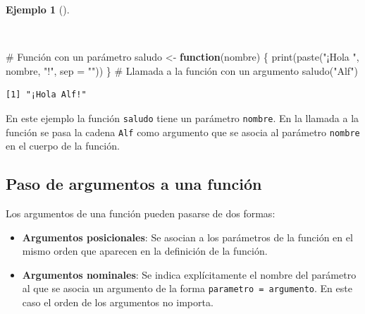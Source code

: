 \documentclass[
  spanish,
  a4paper,
]{scrreport}
\newenvironment{Shaded}{\begin{snugshade}}{\end{snugshade}}
\newcommand{\AttributeTok}[1]{\textcolor[rgb]{0.40,0.45,0.13}{#1}}
\newcommand{\CommentTok}[1]{\textcolor[rgb]{0.37,0.37,0.37}{#1}}
\newcommand{\ControlFlowTok}[1]{\textcolor[rgb]{0.00,0.23,0.31}{\textbf{#1}}}
\newcommand{\FunctionTok}[1]{\textcolor[rgb]{0.28,0.35,0.67}{#1}}
\newcommand{\NormalTok}[1]{\textcolor[rgb]{0.00,0.23,0.31}{#1}}
\newcommand{\OtherTok}[1]{\textcolor[rgb]{0.00,0.23,0.31}{#1}}
\newcommand{\StringTok}[1]{\textcolor[rgb]{0.13,0.47,0.30}{#1}}
\providecommand{\tightlist}{%
  \setlength{\itemsep}{0pt}\setlength{\parskip}{0pt}}
\theoremstyle{definition}
\theoremstyle{definition}
\newtheorem{example}{Ejemplo}[chapter]
\theoremstyle{remark}
\begin{document}
\begin{example}[]\protect\hypertarget{exm-funcion-con-parametros}{}\label{exm-funcion-con-parametros}

~

\begin{Shaded}
\begin{Highlighting}[]
\CommentTok{\# Función con un parámetro}
\NormalTok{saludo }\OtherTok{\textless{}{-}} \ControlFlowTok{function}\NormalTok{(nombre) \{}
  \FunctionTok{print}\NormalTok{(}\FunctionTok{paste}\NormalTok{(}\StringTok{"¡Hola "}\NormalTok{, nombre, }\StringTok{"!"}\NormalTok{, }\AttributeTok{sep =} \StringTok{""}\NormalTok{))}
\NormalTok{\}}
\CommentTok{\# Llamada a la función con un argumento}
\FunctionTok{saludo}\NormalTok{(}\StringTok{"Alf"}\NormalTok{)}
\end{Highlighting}
\end{Shaded}

\begin{verbatim}
[1] "¡Hola Alf!"
\end{verbatim}

En este ejemplo la función \texttt{saludo} tiene un parámetro
\texttt{nombre}. En la llamada a la función se pasa la cadena
\texttt{Alf} como argumento que se asocia al parámetro \texttt{nombre}
en el cuerpo de la función.

\end{example}

\subsection{Paso de argumentos a una
función}\label{paso-de-argumentos-a-una-funciuxf3n}

Los argumentos de una función pueden pasarse de dos formas:

\begin{itemize}
\tightlist
\item
  \textbf{Argumentos posicionales}: Se asocian a los parámetros de la
  función en el mismo orden que aparecen en la definición de la función.
\item
  \textbf{Argumentos nominales}: Se indica explícitamente el nombre del
  parámetro al que se asocia un argumento de la forma
  \texttt{parametro\ =\ argumento}. En este caso el orden de los
  argumentos no importa.
\end{itemize}
\end{document}
